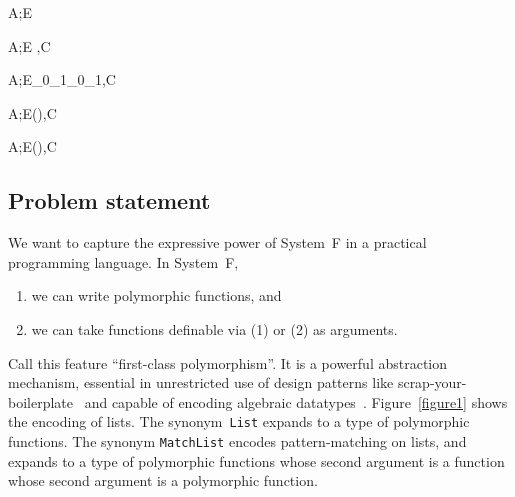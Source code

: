 \documentclass{amsart}
\begin{document}
{\begin{minipage}{\RightWidth}
\infrule[S-vacuous]
{}
{A;E\vdash\emptyset}

{A;E \vdash \tau\Sub\tau,C}

{A;E\vdash\sigma_0\R\sigma_1\Sub\tau_0\R\tau_1,C}

{A;E\vdash(\All\alpha\sigma)\Sub\tau,C}

{A;E\vdash\sigma\Sub(\All\alpha\tau),C}



\begingroup
\DoCap
{}
\label{figure2}
\endgroup
\end{minipage}
}

\vfil
\break


\def\Fig#1{Figure~\ref{figure#1}}
\def\fig#1{figure~\ref{figure#1}}

\normalsize

\subsection{Problem statement}

We want to capture the expressive power of System~F in a
practical programming language.
In System~F,
\begin{enumerate}
\item we can write polymorphic functions, and
\item we can take functions definable via (1) or (2) as arguments.
\end{enumerate}
Call this feature ``first-class polymorphism''. It is a powerful
abstraction mechanism, essential in unrestricted use of design
patterns like scrap-your-boilerplate~\cite{Laemmel03} and capable
of encoding algebraic datatypes~\cite{Boehm85}. \Fig1 shows the
encoding of lists. The synonym~\texttt{List} expands to a type of
polymorphic functions. The synonym \texttt{MatchList} encodes
pattern-matching on lists, and expands to a type of polymorphic
functions whose second argument is a function whose second
argument is a polymorphic function.
\end{document}
